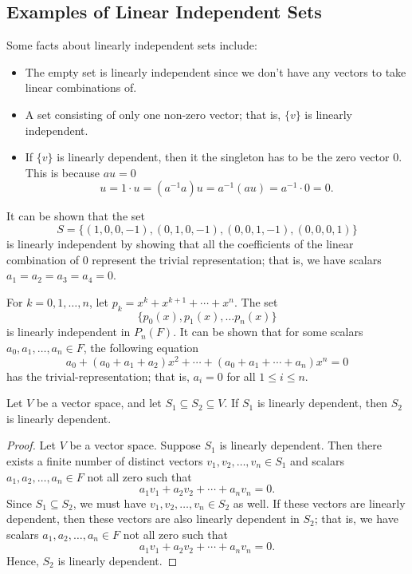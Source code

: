 \subsection{Examples of Linear Independent Sets}

Some facts about linearly independent sets include:
\begin{itemize}
    \item The empty set is linearly independent since we don't have any vectors to take linear combinations of.
    \item A set consisting of only one non-zero vector; that is, \( \{ v  \}  \) is linearly independent.
    \item If \( \{ v  \}  \) is linearly dependent, then it the singleton has to be the zero vector \( 0 \). This is because \( au = 0  \) 
        \[  u = 1 \cdot u =  (a^{-1} a ) u = a^{-1} (au) = a^{-1} \cdot 0 = 0.    \]
\end{itemize}

\begin{eg}
     It can be shown that the set
    \[  S = \{ (1,0,0,-1) , (0,1,0,-1) , (0,0,1,-1), (0,0,0,1) \}  \] is linearly independent by showing that all the coefficients of the linear combination of 0 represent the trivial representation; that is, we have scalars \( a_{1} = a_{2} = a_{3} = a_{4} = 0  \).
\end{eg}

\begin{eg}
    For \( k = 0,1, \dots, n  \), let \( p_{k} = x^{k } + x^{k+1}  + \cdots + x^{n}  \). The set 
    \[  \{ p_{0}(x), p_{1}(x), \dots p_{n}(x) \}  \] is linearly independent in \( P_{n}(F) \).
    It can be shown that for some scalars \( a_{0}, a_{1} , \dots , a_{n} \in F   \),  the following equation 
    \[  a_{0} + (a_{0} + a_{1} + a_{2})x^{2} + \cdots + (a_{0} + a_{1} + \cdots + a_{n})x^{n} = 0  \]
    has the trivial-representation; that is, \( a_{i} = 0  \) for all \( 1 \leq i \leq n \).
\end{eg}

\begin{theorem}[ ]
    Let \( V  \) be a vector space, and let \( S_{1} \subseteq S_{2} \subseteq V  \). If \( S_{1}  \) is linearly dependent, then \( S_{2}  \) is linearly dependent.
\end{theorem}
\begin{proof}
Let \( V  \) be a vector space. Suppose \( S_{1}  \) is linearly dependent. Then there exists a finite number of distinct vectors \( v_{1}, v_{2}, \dots, v_{n} \in S_{1}  \) and scalars \( a_{1}, a_{2}, \dots, a_{n} \in F  \) not all zero such that 
\[  a_{1} v_{1} + a_{2} v_{2} + \cdots + a_{n} v_{n} = 0.  \]
Since \( S_{1} \subseteq S_{2}  \), we must have \( v_{1} , v_{2}, \dots, v_{n} \in S_{2} \) as well. If these vectors are linearly dependent, then these vectors are also linearly dependent in \( S_{2} \); that is, we have scalars \( a_{1}, a_{2}, \dots, a_{n} \in F  \) not all zero such that  
\[  a_{1} v_{1} + a_{2} v_{2} + \cdots + a_{n} v_{n} = 0.  \]
Hence, \( S_{2}  \) is linearly dependent.
\end{proof}

